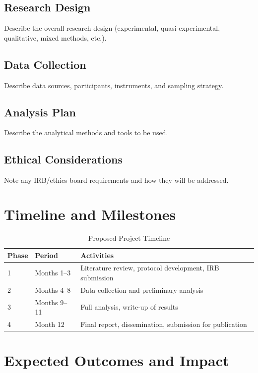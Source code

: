 \documentclass[11pt]{article}
\begin{document}
\subsection{Research Design}
Describe the overall research design (experimental, quasi-experimental,
qualitative, mixed methods, etc.).

\subsection{Data Collection}
Describe data sources, participants, instruments, and sampling strategy.

\subsection{Analysis Plan}
Describe the analytical methods and tools to be used.

\subsection{Ethical Considerations}
Note any IRB/ethics board requirements and how they will be addressed.

\section{Timeline and Milestones}

\begin{table}[ht]
  \centering
  \caption{Proposed Project Timeline}
  \label{tab:timeline}
  \begin{tabular}{llp{7cm}}
    \toprule
    Phase & Period & Activities \\
    \midrule
    1 & Months 1--3  & Literature review, protocol development, IRB submission \\
    2 & Months 4--8  & Data collection and preliminary analysis \\
    3 & Months 9--11 & Full analysis, write-up of results \\
    4 & Month 12     & Final report, dissemination, submission for publication \\
    \bottomrule
  \end{tabular}
\end{table}

\section{Expected Outcomes and Impact}
\end{document}
